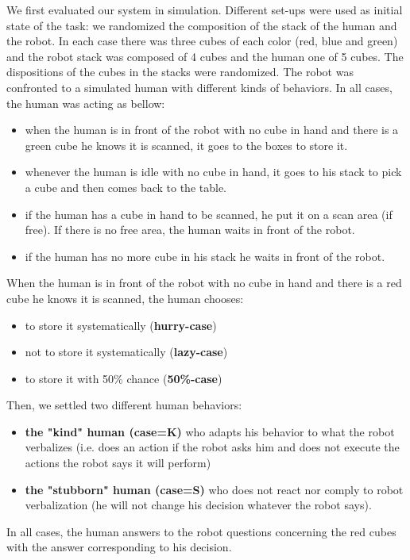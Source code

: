 \documentclass[english,a4paper,11pt,twoside]{StyleThese}
\begin{document}
We first evaluated our system in simulation. Different set-ups were used as initial state of the task: we randomized the composition of the stack of the human and the robot. In each case there was three cubes of each color (red, blue and green) and the robot stack was composed of 4 cubes and the human one of 5 cubes. The dispositions of the cubes in the stacks were randomized. The robot was confronted to a simulated human with different kinds of behaviors. In all cases, the human was acting as bellow:
\begin{itemize}
\item when the human is in front of the robot with no cube in hand and there is a green cube he knows it is scanned, it goes to the boxes to store it.
\item whenever the human is idle with no cube in hand, it goes to his stack to pick a cube and then comes back to the table.
\item if the human has a cube in hand to be scanned, he put it on a scan area (if free). If there is no free area, the human waits in front of the robot.
\item if the human has no more cube in his stack he waits in front of the robot.
\end{itemize}
When the human is in front of the robot with no cube in hand and there is a red cube he knows it is scanned, the human chooses:
\begin{itemize}
\item to store it systematically (\textbf{hurry-case})
\item not to store it systematically (\textbf{lazy-case})
\item to store it with 50\% chance (\textbf{50\%-case})
\end{itemize}
Then, we settled two different human behaviors:
\begin{itemize}
\item \textbf{the "kind" human (case=K)} who adapts his behavior to what the robot verbalizes (i.e. does an action if the robot asks him and does not execute the actions the robot says it will perform)
\item \textbf{the "stubborn" human (case=S)} who does not react nor comply to robot verbalization (he will not change his decision whatever the robot says).
\end{itemize}
In all cases, the human answers to the robot questions concerning the red cubes with the answer corresponding to his decision.
\end{document}
